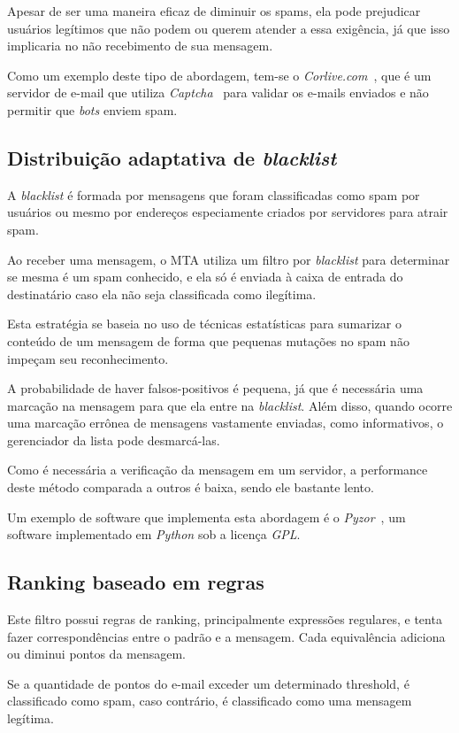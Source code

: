 \documentclass[a4paper,dvipdfm]{article}
\begin{document}
		Apesar de ser uma maneira eficaz de diminuir os spams, ela pode prejudicar usuários legítimos que não podem ou querem atender a essa exigência, já que isso implicaria no não recebimento de sua mensagem.

		Como um exemplo deste tipo de abordagem, tem-se o \emph{Corlive.com}~\cite{corlive}, que é um servidor de e-mail que utiliza \emph{Captcha}~\cite{captcha} para validar os e-mails enviados e não permitir que \emph{bots} enviem spam.

	\subsection{Distribuição adaptativa de \emph{blacklist}}
		A \emph{blacklist} é formada por mensagens que foram classificadas como spam por usuários ou mesmo por endereços especiamente criados por servidores para atrair spam.

		Ao receber uma mensagem, o MTA utiliza um filtro por \emph{blacklist} para determinar se mesma é um spam conhecido, e ela só é enviada à caixa de entrada do destinatário caso ela não seja classificada como ilegítima.

		Esta estratégia se baseia no uso de técnicas estatísticas para sumarizar o conteúdo de um mensagem de forma que pequenas mutações no spam não impeçam seu reconhecimento.

		A probabilidade de haver falsos-positivos é pequena, já que é necessária uma marcação na mensagem para que ela entre na \emph{blacklist}. Além disso, quando ocorre uma marcação errônea de mensagens vastamente enviadas, como informativos, o gerenciador da lista pode desmarcá-las.
		
		Como é necessária a verificação da mensagem em um servidor, a performance deste método comparada a outros é baixa, sendo ele bastante lento.

		Um exemplo de software que implementa esta abordagem é o \emph{Pyzor}~\cite{pyzor}, um software implementado em \emph{Python} sob a licença \emph{GPL}.

	\subsection{Ranking baseado em regras}
		Este filtro possui regras de ranking, principalmente expressões regulares, e tenta fazer correspondências entre o padrão e a mensagem. 
		Cada equivalência adiciona ou diminui pontos da mensagem.
		
		Se a quantidade de pontos do e-mail exceder um determinado threshold, é classificado como spam, caso contrário, é classificado como uma mensagem legítima.
\end{document}
